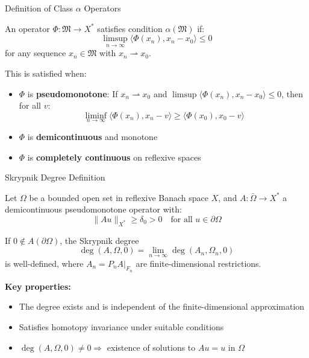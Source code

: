 \documentclass[aspectratio=169,10pt]{beamer}
\begin{document}
\begin{frame}{Definition of Class $\alpha$ Operators}

\begin{definition}
An operator $\Phi: \mathfrak{M} \to X^*$ satisfies \alert{condition $\alpha(\mathfrak{M})$} if:
\[
\limsup_{n \to \infty} \langle \Phi(x_n), x_n - x_0 \rangle \leq 0
\]
for any sequence $x_n \in \mathfrak{M}$ with $x_n \rightharpoonup x_0$.

This is satisfied when:
\end{definition}

\begin{itemize}
    \item $\Phi$ is \textbf{pseudomonotone}: If $x_n \rightharpoonup x_0$ and $\limsup \langle \Phi(x_n), x_n - x_0 \rangle \leq 0$, then for all $v$:
    \[
    \liminf_{n \to \infty} \langle \Phi(x_n), x_n - v \rangle \geq \langle \Phi(x_0), x_0 - v \rangle
    \]

    \item $\Phi$ is \textbf{demicontinuous} and monotone

    \item $\Phi$ is \textbf{completely continuous} on reflexive spaces
\end{itemize}

\end{frame}

\begin{frame}{Skrypnik Degree Definition}

\begin{theorem}
Let $\Omega$ be a bounded open set in reflexive Banach space $X$, and $A: \bar{\Omega} \to X^*$ a demicontinuous pseudomonotone operator with:
\[
\|Au\|_{X^*} \geq \delta_0 > 0 \quad \text{for all } u \in \partial\Omega
\]

If $0 \notin A(\partial\Omega)$, the \alert{Skrypnik degree}
\[
\deg(A, \Omega, 0) = \lim_{n \to \infty} \deg(A_n, \Omega_n, 0)
\]
is well-defined, where $A_n = P_n A|_{F_n}$ are finite-dimensional restrictions.
\end{theorem}

\vspace{0.3cm}

\textbf{Key properties:}
\begin{itemize}
    \item The degree exists and is independent of the finite-dimensional approximation
    \item Satisfies homotopy invariance under suitable conditions
    \item $\deg(A, \Omega, 0) \neq 0 \Rightarrow$ existence of solutions to $Au = u$ in $\Omega$
\end{itemize}

\end{frame}
\end{document}
